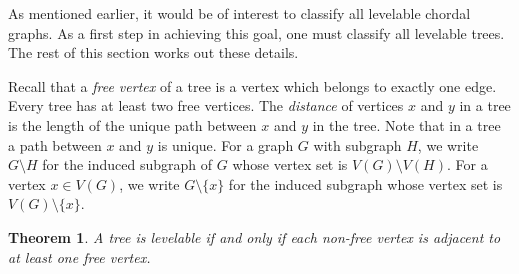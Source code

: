 \documentclass[12pt]{amsart}
\numberwithin{equation}{section}
\newtheorem{theorem}{Theorem}[section]
\theoremstyle{definition}
\newcounter{i} %
\begin{document}
As mentioned earlier, 
it would be of interest to classify all
levelable chordal graphs. 
As a first step in achieving this 
goal,  one must classify all levelable trees. The
rest of this section works out these details.



Recall that a {\it free vertex} of a tree is a vertex which belongs to exactly one edge.  Every tree has at least two free vertices.  The {\it distance} of vertices $x$ and $y$ in a tree is the length of the unique path
between $x$ and $y$ in the tree.  Note that in a tree a path between $x$ and $y$ is unique. For a graph $G$ with subgraph $H$, we write $G\setminus H$ for the induced subgraph of $G$ whose vertex set is $V(G) \setminus V(H)$. For a vertex $x \in V(G)$, we write $G\setminus \{x\}$ for the induced subgraph whose vertex set is  $V(G) \setminus \{x\}$.



 \begin{theorem}\label{thm.trees}
 A tree is levelable if and only if each non-free vertex is adjacent to at least one free vertex.  
\end{theorem}
\end{document}
